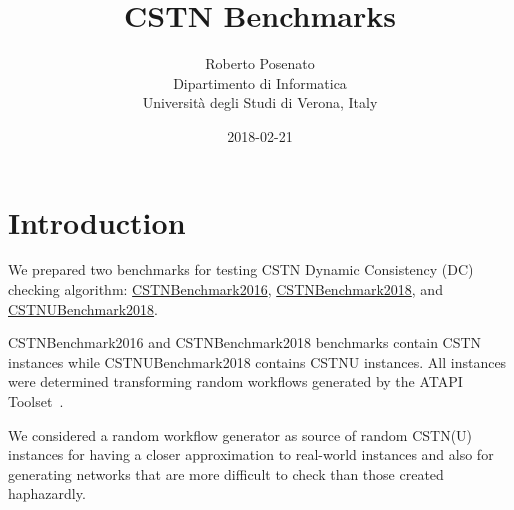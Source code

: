 \documentclass[a4paper,11pt]{article}
\begin{document}
\title{CSTN Benchmarks}
\author{Roberto Posenato\\
	Dipartimento di Informatica\\
	Università degli Studi di Verona, Italy}
\date{2018-02-21}

\ifpdf
\maketitle
\fi 

\section{Introduction}

We prepared two benchmarks for testing CSTN Dynamic Consistency (DC) checking algorithm: \href{http://profs.scienze.univr.it/~posenato/software/benchmarks/CSTNBenchmark2016.tgz}{CSTNBenchmark2016},
 \href{http://profs.scienze.univr.it/~posenato/software/benchmarks/CSTNBenchmark2018.tgz}{CSTNBenchmark2018}, and \href{http://profs.scienze.univr.it/~posenato/software/benchmarks/CSTNUBenchmark2018.tgz}{CSTNUBenchmark2018}.

CSTNBenchmark2016 and CSTNBenchmark2018 benchmarks contain CSTN instances while CSTNUBenchmark2018 contains CSTNU instances. 
All instances were determined transforming random workflows generated by the ATAPI Toolset~\cite{Lanz14b}.  

We considered a random workflow generator as source of random CSTN(U) instances for having a closer approximation to real-world instances and also for generating networks that are more difficult to check than those created haphazardly.
\end{document}
